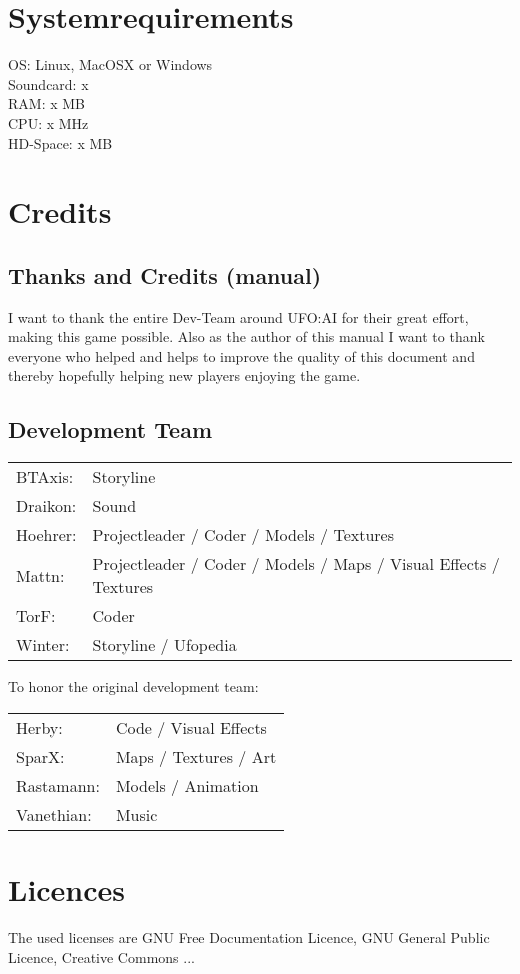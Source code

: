 \section{Systemrequirements}
OS: Linux, MacOSX or Windows\\
Soundcard: x\\
RAM: x MB\\
CPU: x MHz\\
HD-Space: x MB\\

\newpage

\section{Credits}
\subsection{Thanks and Credits (manual)}
I want to thank the entire Dev-Team around UFO:AI for their great effort, making this game possible. Also as the author of this manual I want to thank everyone who helped and helps to improve the quality of this document and thereby hopefully helping new players enjoying the game.

\subsection{Development Team}
\begin{tabular}{ll}
BTAxis:  	&	Storyline \\
Draikon:	&	Sound \\	
Hoehrer:  	&	Projectleader / Coder / Models / Textures \\
Mattn:  	&	Projectleader / Coder / Models / Maps / Visual Effects / Textures \\
TorF:  		&	Coder \\
Winter:		&	Storyline / Ufopedia \\
\end{tabular} 

To honor the original development team:\\
\begin{tabular}{ll}
Herby:  	&	Code / Visual Effects\\ 
SparX:  	&	Maps / Textures / Art\\ 
Rastamann:	&	Models / Animation\\ 
Vanethian:  &	Music\\ 
\end{tabular} 

\newpage

\section{Licences}
The used licenses are GNU Free Documentation Licence, GNU General Public Licence, Creative Commons ...

